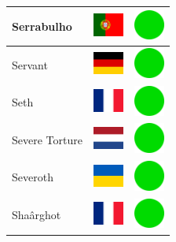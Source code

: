 \documentclass[12pt, a4paper, twoside]{report}
\begin{document}
\begin{center}
\begin{longtable}{|p{5cm}|p{2cm}|p{2cm}|}
 Serrabulho                                                 & \includegraphics[width=1cm]{../img/flags/pt} &   \includegraphics[width=1cm]{../likes/y} \\ \hline
 Servant                                                    & \includegraphics[width=1cm]{../img/flags/de} &   \includegraphics[width=1cm]{../likes/y} \\ \hline
 Seth                                                       & \includegraphics[width=1cm]{../img/flags/fr} &   \includegraphics[width=1cm]{../likes/y} \\ \hline
 Severe Torture                                             & \includegraphics[width=1cm]{../img/flags/nl} &   \includegraphics[width=1cm]{../likes/y} \\ \hline
 Severoth                                                   & \includegraphics[width=1cm]{../img/flags/ua} &   \includegraphics[width=1cm]{../likes/y} \\ \hline
 Shaârghot                                                  & \includegraphics[width=1cm]{../img/flags/fr} &   \includegraphics[width=1cm]{../likes/y} \\ \hline

\end{longtable}
\end{center}
\end{document}

